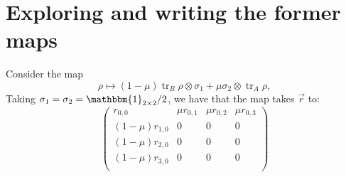 \documentclass[letterpaper,12pt]{article} %
\newcommand{\one}{\mathbbm{1}}
\newcommand{\<}{\langle}
\newcommand{\tr}{\mathop{\mathrm{tr}}\nolimits}
\begin{document}
\section{Exploring and writing the former maps}
Consider the map
\begin{equation}
\rho \mapsto (1-\mu) \tr_B \rho \otimes \sigma_1+\mu \sigma_2 \otimes \tr_A \rho,
\end{equation}
Taking $\sigma_1=\sigma_2=\one_{2 \times 2}/2$, we have that the map takes $\vec r$ to:
\begin{equation}
\left(
\begin{array}{cccc}
 r_{0,0} & \mu  r_{0,1} & \mu  r_{0,2} & \mu  r_{0,3} \\
 (1-\mu) r_{1,0} & 0 & 0 & 0 \\
 (1-\mu) r_{2,0} & 0 & 0 & 0 \\
 (1-\mu) r_{3,0} & 0 & 0 & 0 \\
\end{array}
\right)
\end{equation}

 
\end{document}
